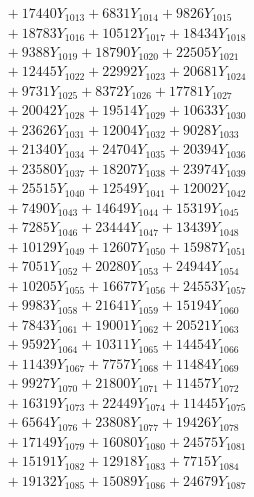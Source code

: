 \documentclass[a4paper,10pt]{article}
\begin{document}
{\begin{align}
&\;  + 17440 Y_{1013} + 6831 Y_{1014} + 9826 Y_{1015} \\[0.3ex]
&\;  + 18783 Y_{1016} + 10512 Y_{1017} + 18434 Y_{1018} \\[0.5ex]\allowbreak
&\;  + 9388 Y_{1019} + 18790 Y_{1020} + 22505 Y_{1021} \\[0.3ex]
&\;  + 12445 Y_{1022} + 22992 Y_{1023} + 20681 Y_{1024} \\[0.3ex]
&\;  + 9731 Y_{1025} + 8372 Y_{1026} + 17781 Y_{1027} \\[0.3ex]
&\;  + 20042 Y_{1028} + 19514 Y_{1029} + 10633 Y_{1030} \\[0.3ex]
&\;  + 23626 Y_{1031} + 12004 Y_{1032} + 9028 Y_{1033} \\[0.3ex]
&\;  + 21340 Y_{1034} + 24704 Y_{1035} + 20394 Y_{1036} \\[0.3ex]
&\;  + 23580 Y_{1037} + 18207 Y_{1038} + 23974 Y_{1039} \\[0.3ex]
&\;  + 25515 Y_{1040} + 12549 Y_{1041} + 12002 Y_{1042} \\[0.3ex]
&\;  + 7490 Y_{1043} + 14649 Y_{1044} + 15319 Y_{1045} \\[0.3ex]
&\;  + 7285 Y_{1046} + 23444 Y_{1047} + 13439 Y_{1048} \\[0.5ex]\allowbreak
&\;  + 10129 Y_{1049} + 12607 Y_{1050} + 15987 Y_{1051} \\[0.3ex]
&\;  + 7051 Y_{1052} + 20280 Y_{1053} + 24944 Y_{1054} \\[0.3ex]
&\;  + 10205 Y_{1055} + 16677 Y_{1056} + 24553 Y_{1057} \\[0.3ex]
&\;  + 9983 Y_{1058} + 21641 Y_{1059} + 15194 Y_{1060} \\[0.3ex]
&\;  + 7843 Y_{1061} + 19001 Y_{1062} + 20521 Y_{1063} \\[0.3ex]
&\;  + 9592 Y_{1064} + 10311 Y_{1065} + 14454 Y_{1066} \\[0.3ex]
&\;  + 11439 Y_{1067} + 7757 Y_{1068} + 11484 Y_{1069} \\[0.3ex]
&\;  + 9927 Y_{1070} + 21800 Y_{1071} + 11457 Y_{1072} \\[0.3ex]
&\;  + 16319 Y_{1073} + 22449 Y_{1074} + 11445 Y_{1075} \\[0.3ex]
&\;  + 6564 Y_{1076} + 23808 Y_{1077} + 19426 Y_{1078} \\[0.5ex]\allowbreak
&\;  + 17149 Y_{1079} + 16080 Y_{1080} + 24575 Y_{1081} \\[0.3ex]
&\;  + 15191 Y_{1082} + 12918 Y_{1083} + 7715 Y_{1084} \\[0.3ex]
&\;  + 19132 Y_{1085} + 15089 Y_{1086} + 24679 Y_{1087} \\[0.3ex]

\end{align}}
\end{document}
